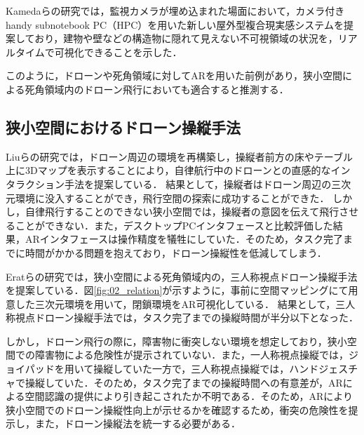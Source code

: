 \documentclass[submit,techrep]{ipsj}
\begin{document}
Kamedaらの研究\cite{Kameda}では，監視カメラが埋め込まれた場面において，カメラ付きhandy subnotebook PC（HPC）を用いた新しい屋外型複合現実感システムを提案しており，建物や壁などの構造物に隠れて見えない不可視領域の状況を，リアルタイムで可視化できることを示した．

このように，ドローンや死角領域に対してARを用いた前例があり，狭小空間による死角領域内のドローン飛行においても適合すると推測する．

\subsection{狭小空間におけるドローン操縦手法}

Liuらの研究\cite{Liu}では，ドローン周辺の環境を再構築し，操縦者前方の床やテーブル上に3Dマップを表示することにより，自律航行中のドローンとの直感的なインタラクション手法を提案している．
結果として，操縦者はドローン周辺の三次元環境に没入することができ，飛行空間の探索に成功することができた．
しかし，自律飛行することのできない狭小空間では，操縦者の意図を伝えて飛行させることができない．また，デスクトップPCインタフェースと比較評価した結果，ARインタフェースは操作精度を犠牲にしていた．そのため，タスク完了までに時間がかかる問題を抱えており，ドローン操縦性を低減してしまう．

Eratらの研究\cite{Erat}では，狭小空間による死角領域内の，三人称視点ドローン操縦手法を提案している．図\ref{fig:02_relation}が示すように，事前に空間マッピングにて用意した三次元環境を用いて，閉鎖環境をAR可視化している．
結果として，三人称視点ドローン操縦手法では，タスク完了までの操縦時間が半分以下となった．

しかし，ドローン飛行の際に，障害物に衝突しない環境を想定しており，狭小空間での障害物による危険性が提示されていない．また，一人称視点操縦では，ジョイパッドを用いて操縦していた一方で，三人称視点操縦では，ハンドジェスチャで操縦していた．そのため，タスク完了までの操縦時間への有意差が，ARによる空間認識の提供により引き起こされたか不明である．そのため，ARにより狭小空間でのドローン操縦性向上が示せるかを確認するため，衝突の危険性を提示し，また，ドローン操縦法を統一する必要がある．

\end{document}
